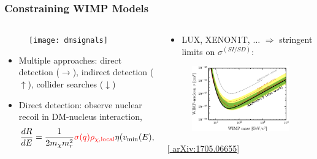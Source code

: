 \documentclass[10pt,aspectratio=169]{beamer}
\begin{document}
\begin{frame}
  \frametitle{Constraining WIMP Models}
  \begin{columns}[t]
    \begin{column}{0.5\textwidth}
      \begin{figure}
        \centering
        \texttt{[image: dmsignals]}
      \end{figure}
      \vspace*{-10pt}
      \begin{itemize} \itemsep1em
      \item Multiple approaches: {\color{blue} direct detection}
        ($\rightarrow$), indirect detection ($\uparrow$), collider searches
        ($\downarrow$)
      \item Direct detection: observe nuclear recoil in DM-nucleus interaction,
        \begin{equation*}
          \frac{d R}{d E} =\frac{1}{2 m_\chi m_r^2} {\color{red}
            \sigma(q) \rho_{\chi, \text{local}}} \eta(v_{\text{min}}(E), t)
        \end{equation*}
      \end{itemize}
    \end{column}
    \begin{column}{0.5\textwidth}
      \begin{itemize}\itemsep1em
      \item \alert{LUX, XENON1T, $\ldots$ $\Rightarrow$ stringent limits on
        $\sigma^{(SI/SD)}$:}
      \end{itemize}
      \begin{figure}
        \centering
        \includegraphics[width=\textwidth]{xenon1t_si_limit}
      \end{figure}
      \vspace*{-20pt}
      \begin{center}
        {\tiny [\href{http://arxiv.org/abs/1705.06655}{%
              arXiv:1705.06655}]}
      \end{center}
    \end{column}
  \end{columns}
\end{frame}
\end{document}

